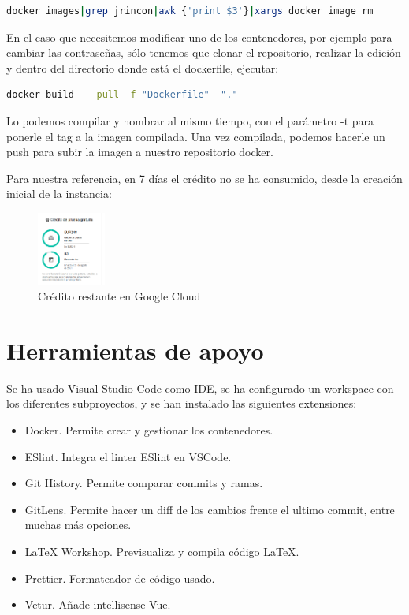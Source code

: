 \documentclass[11pt,spanish,listoffigures,listoftables]{tfgetsinf}
\begin{document}
\begin{lstlisting}[language=bash, caption={Borrado de imágenes con el texto jrincon}]
  docker images|grep jrincon|awk {'print $3'}|xargs docker image rm
\end{lstlisting}

En el caso que necesitemos modificar uno de los contenedores, por ejemplo para cambiar las contraseñas, sólo tenemos que clonar el repositorio, realizar la edición y dentro del directorio donde está el dockerfile, ejecutar:

\begin{lstlisting}[language=bash, caption={Comando docker para construir una imagen}]
  docker build  --pull -f "Dockerfile"  "."
\end{lstlisting}

Lo podemos compilar y nombrar al mismo tiempo, con el parámetro -t para ponerle el tag a la imagen compilada. Una vez compilada, podemos hacerle un push para subir la imagen a nuestro repositorio docker.

Para nuestra referencia, en 7 días el crédito no se ha consumido, desde la creación inicial de la instancia:

\begin{figure}[h!] %
  \centering
   \includegraphics[width=0.20\textwidth]{img/Credito.png}
   \caption{Crédito restante en Google Cloud}
   \label{fig:creditogoogle}
 \end{figure}

\chapter{Herramientas de apoyo}

Se ha usado Visual Studio Code como IDE, se ha configurado un workspace con los diferentes subproyectos, y se han instalado las siguientes extensiones:
\begin{itemize}
  \item Docker. Permite crear y gestionar los contenedores.
  \item ESlint. Integra el linter ESlint en VSCode.
  \item Git History. Permite comparar commits y ramas.
  \item GitLens. Permite hacer un diff de los cambios frente el ultimo commit, entre muchas más opciones.
  \item LaTeX Workshop. Previsualiza y compila código LaTeX.
  \item Prettier. Formateador de código usado.
  \item Vetur. Añade intellisense Vue.
\end{itemize}
\end{document}
